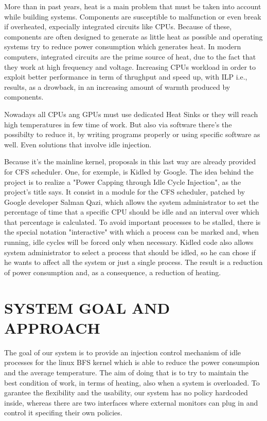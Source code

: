 \documentclass[journal]{IEEEtran}
\begin{document}
More than in past years, heat is a main problem that must be taken
into account while building systems. Components are susceptible to
malfunction or even break if overheated, expecially integrated circuits
like CPUs. Because of these, components are often designed to generate
as little heat as possible and operating systems try to reduce power
consumption which generates heat. In modern computers, integrated
circuits are the prime source of heat, due to the fact that they work
at high frequency and voltage. Increasing CPUs workload in order to
exploit better performance in term of thrughput and speed up, with
ILP i.e., results, as a drowback, in an increasing amount of warmth
produced by components.

Nowadays all CPUs ang GPUs must use dedicated Heat Sinks or they will
reach high temperatures in few time of work. But also via software
there's the possibilty to reduce it, by writing programs properly
or using specific software as well. Even solutions that involve idle
injection.\medskip{}


Because it's the mainline kernel, proposals in this last way are already
provided for CFS scheduler. One, for exemple, is Kidled by Google.
The idea behind the project is to realize a "Power Capping
through Idle Cycle Injection", as the project's title
says. It consist in a module for the CFS scheduler, patched by Google
developer Salman Qazi, which allows the system administrator to set
the percentage of time that a specific CPU should be idle and an interval
over which that percentage is calculated. To avoid important processes
to be stalled, there is the special notation "interactive"
with which a process can be marked and, when running, idle cycles
will be forced only when necessary. Kidled code also allows system
administrator to select a process that should be idled, so he can
chose if he wants to affect all the system or just a single process.
The result is a reduction of power consumption and, as a consequence,
a reduction of heating.


\section{SYSTEM GOAL AND APPROACH}

The goal of our system is to provide an injection control mechanism
of idle processes for the linux BFS kernel which is able to reduce
the power consumpion and the average temperature. The aim of doing
that is to try to maintain the best condition of work, in terms of
heating, also when a system is overloaded. To garantee the flexibility
and the usability, our system has no policy hardcoded inside, whereas
there are two interfaces where external monitors can plug in and control
it specifing their own policies.\medskip{}
\end{document}
